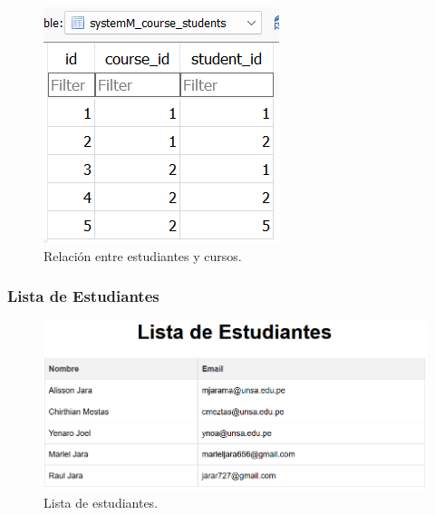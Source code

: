 \documentclass{article}
\begin{document}
\begin{figure}[H]
\begin{minipage}{0.3\textwidth}
	\end{minipage}
	\begin{minipage}{0.3\textwidth}
		\centering
		\includegraphics[width=\linewidth,keepaspectratio]{img/relation.png}
		\caption{Relación entre estudiantes y cursos.}
	\end{minipage}
\end{figure}

\subsubsection{Lista de Estudiantes}
\begin{figure}[H]
	\centering
	\begin{minipage}{0.6\textwidth}
		\centering
		\includegraphics[width=\linewidth,keepaspectratio]{img/listStudents.png}
		\caption{Lista de estudiantes.}
	\end{minipage}
\end{figure}
\end{document}
